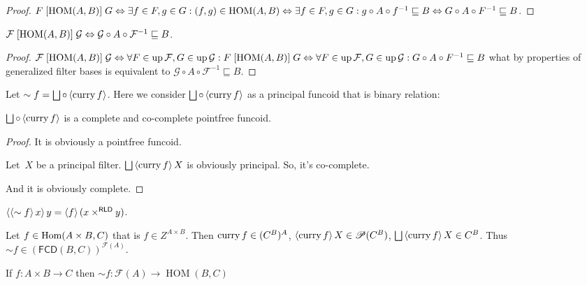 \begin{proof}
$F\mathrel{\left[\operatorname{HOM}(A,B)\right]}G \Leftrightarrow
\exists f\in F,g\in G:(f,g)\in\operatorname{HOM}(A,B)\Leftrightarrow
\exists f\in F,g\in G:g\circ A\circ f^{-1}\sqsubseteq B\Leftrightarrow
G\circ A\circ F^{-1}\sqsubseteq B$.
\end{proof}

\begin{prop}
$\mathcal{F}\mathrel{\left[\operatorname{HOM}(A,B)\right]}\mathcal{G} \Leftrightarrow \mathcal{G}\circ A\circ \mathcal{F}^{-1}\sqsubseteq B$.
\end{prop}

\begin{proof}
$\mathcal{F}\mathrel{\left[\operatorname{HOM}(A,B)\right]}\mathcal{G} \Leftrightarrow
\forall F\in\operatorname{up}\mathcal{F},G\in\operatorname{up}\mathcal{G}:F\mathrel{\left[\operatorname{HOM}(A,B)\right]}G
\Leftrightarrow
\forall F\in\operatorname{up}\mathcal{F},G\in\operatorname{up}\mathcal{G}:G\circ A\circ F^{-1}\sqsubseteq B$ what by properties of generalized filter
bases is equivalent to $\mathcal{G}\circ A\circ \mathcal{F}^{-1}\sqsubseteq B$.
\end{proof}

Let $\sim f=\bigsqcup\circ\supfun{\curry f}$. Here we consider $\bigsqcup\circ\supfun{\curry f}$ as a principal funcoid that is binary relation:

\begin{prop}
$\bigsqcup\circ\supfun{\curry f}$ is a complete and co-complete pointfree funcoid.
\end{prop}

\begin{proof}
It is obviously a pointfree funcoid.

Let~$X$ be a principal filter.
$\bigsqcup\supfun{\curry f}X$ is obviously principal.
So, it's co-complete.

And it is obviously complete.
\end{proof}

\begin{obvious}
$\left\langle \left\langle \sim f\right\rangle x\right\rangle y = \left\langle f\right\rangle(x\times^{\mathsf{RLD}}y)$.
\end{obvious}

Let $f\in\operatorname{Hom}(A\times B,C)$ that is $f\in Z^{A\times B}$. Then
$\operatorname{curry} f\in (C^B)^A$, $\left\langle \operatorname{curry} f\right\rangle X\in\mathscr{P}(C^B)$,
$\bigsqcup\supfun{\curry f}X\in C^B$.
Thus $\sim f\in (\mathsf{FCD}(B,C))^{\mathscr{F}(A)}$.

If $f : A \times B \rightarrow C$ then $\sim f : \mathscr{F}(A) \rightarrow \operatorname{HOM} ( B , C)$

